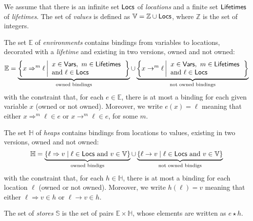 \begin{definition}
  We assume that there is an infinite set $\mathsf{Locs}$ of \emph{locations}
  and a finite set $\mathsf{Lifetimes}$ of \emph{lifetimes}.
  The set of \emph{values} is defined as $\mathbb{V}=\mathbb{Z}\cup\mathsf{Locs}$,
  where $\mathbb{Z}$ is the set of integers.

  The set $\mathbb{E}$
  of \emph{environments} contains bindings from variables to locations,
  decorated with a \emph{lifetime} and existing in two versions, owned
  and not owned:
  \[
  \mathbb{E}=
  \underbrace{\left\{x\Rightarrow^m\ell\left|\begin{array}{l}
  x\in\mathsf{Vars},\ m\in\mathsf{Lifetimes}\\
  \text{and }\ell\in\mathsf{Locs}
  \end{array}\right.\right\}}_{\text{owned bindings}}
  \cup
  \underbrace{\left\{x\rightarrow^m\ell\left|\begin{array}{l}
  x\in\mathsf{Vars},\ m\in\mathsf{Lifetimes}\\
  \text{and }\ell\in\mathsf{Locs}
  \end{array}\right.\right\}}_{\text{not owned bindings}}
  \]
  with the constraint that, for each $e\in\mathbb{E}$, there is at most a binding for each
  given variable $x$ (owned or not owned). Moreover, we write $e(x)=\ell$ meaning that
  either $x\Rightarrow^m\ell\in e$ or $x\rightarrow^m\ell\in e$, for some $m$.

  The set $\mathbb{H}$ of \emph{heaps} contains bindings from locations to values,
  existing in two versions, owned and not owned:
  \[
  \mathbb{H}=
  \underbrace{\{\ell\Rightarrow v\mid\ell\in\mathsf{Locs}\text{ and }v\in\mathbb{V}\}}_{\text{owned bindigs}}
  \cup
  \underbrace{\{\ell\rightarrow v\mid\ell\in\mathsf{Locs}\text{ and }v\in\mathbb{V}\}}_{\text{not owned bindigs}}
  \]
  with the constraint that, for each $h\in\mathbb{H}$, there is at most a binding for each
  location $\ell$ (owned or not owned). Moreover, we write $h(\ell)=v$ meaning that
  either $\ell\Rightarrow v\in h$ or $\ell\rightarrow v\in h$.

  The set of \emph{stores} $\mathbb{S}$ is the set of pairs
  $\mathbb{E}\times\mathbb{H}$, whose elements are written as
  $e\star h$.
\end{definition}
